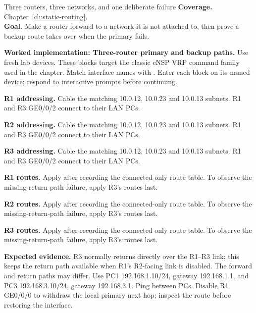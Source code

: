 
\begin{labproject}{Three routers, three networks, and one deliberate failure}
\textbf{Coverage.} Chapter~\ref{ch:static-routing}.\\
\textbf{Goal.} Make a router forward to a network it is not attached to, then prove a backup route takes over when the primary fails.



\noindent\textbf{Worked implementation: Three-router primary and backup paths.}
Use fresh lab devices. These blocks target the classic eNSP VRP command family used in the chapter. Match interface names with . Enter each block on its named device; respond to interactive prompts before continuing.

\noindent\textbf{R1 addressing.} Cable the matching 10.0.12, 10.0.23 and 10.0.13 subnets. R1 and R3 GE0/0/2 connect to their LAN PCs.


\noindent\textbf{R2 addressing.} Cable the matching 10.0.12, 10.0.23 and 10.0.13 subnets. R1 and R3 GE0/0/2 connect to their LAN PCs.


\noindent\textbf{R3 addressing.} Cable the matching 10.0.12, 10.0.23 and 10.0.13 subnets. R1 and R3 GE0/0/2 connect to their LAN PCs.


\noindent\textbf{R1 routes.} Apply after recording the connected-only route table. To observe the missing-return-path failure, apply R3's routes last.


\noindent\textbf{R2 routes.} Apply after recording the connected-only route table. To observe the missing-return-path failure, apply R3's routes last.


\noindent\textbf{R3 routes.} Apply after recording the connected-only route table. To observe the missing-return-path failure, apply R3's routes last.


\textbf{Expected evidence.} R3 normally returns directly over the R1--R3 link; this keeps the return path available when R1's R2-facing link is disabled. The forward and return paths may differ. Use PC1 192.168.1.10/24, gateway 192.168.1.1, and PC3 192.168.3.10/24, gateway 192.168.3.1. Ping between PCs. Disable R1 GE0/0/0 to withdraw the local primary next hop; inspect the route before restoring the interface.





\end{labproject}
